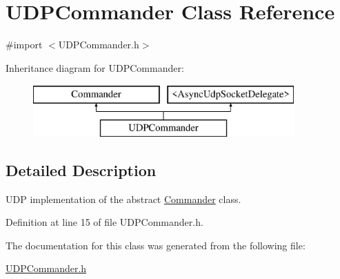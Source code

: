 \hypertarget{interface_u_d_p_commander}{
\section{UDPCommander Class Reference}
\label{interface_u_d_p_commander}
}


{\ttfamily \#import $<$UDPCommander.h$>$}

Inheritance diagram for UDPCommander:\begin{figure}[H]
\begin{center}
\leavevmode
\includegraphics[height=2.000000cm]{interface_u_d_p_commander}
\end{center}
\end{figure}


\subsection{Detailed Description}
UDP implementation of the abstract \hyperlink{interface_commander}{Commander} class. 

Definition at line 15 of file UDPCommander.h.



The documentation for this class was generated from the following file:\begin{DoxyCompactItemize}
\item 
\hyperlink{_u_d_p_commander_8h}{UDPCommander.h}\end{DoxyCompactItemize}
